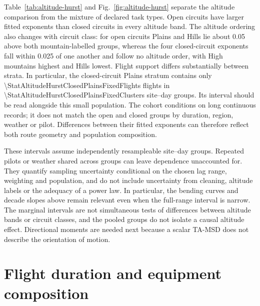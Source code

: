 \begin{table}[htbp]
 \centering
 \caption{Paraglider effective exponents $H_{\mathrm{eff}}$ from the full
 10--10,000-s fit, separately for declared open and closed circuits.
 Brackets give marginal 95\% site--day bootstrap intervals. Flight counts give the
 fixed cohort, which contributes the same flights at every lag. Weighting matches
 Fig.~\ref{fig:altitude-hurst}.}
 \label{tab:altitude-hurst}
 \small
 
\end{table}

Table~\ref{tab:altitude-hurst} and Fig.~\ref{fig:altitude-hurst} separate the
altitude comparison from the mixture of declared task types. Open circuits have
larger fitted exponents than closed circuits in every altitude band. The altitude
ordering also changes with circuit class: for open circuits Plains and Hills lie
about 0.05 above both mountain-labelled groups, whereas the four closed-circuit
exponents fall within 0.025 of one another and follow no altitude order, with High
mountains highest and Hills lowest. Flight support differs substantially between
strata. In particular, the closed-circuit Plains stratum contains only
\num{\StatAltitudeHurstClosedPlainsFixedFlights} flights in
\num{\StatAltitudeHurstClosedPlainsFixedClusters} site--day groups. Its interval
should be read alongside this small population. The cohort conditions on long
continuous records; it does not match the open and closed groups by duration,
region, weather or pilot. Differences between their fitted exponents can therefore
reflect both route geometry and population composition.

These intervals assume independently resampleable site--day groups. Repeated
pilots or weather shared across groups can leave dependence unaccounted for.
They quantify sampling uncertainty conditional on the chosen lag range,
weighting and population, and do not include uncertainty from cleaning,
altitude labels or the adequacy of a power law. In particular, the bending
curves and decade slopes above remain relevant even when the full-range
interval is narrow. The marginal intervals are not simultaneous tests of
differences between altitude bands or circuit classes, and the pooled groups do not isolate a
causal altitude effect. Directional moments are needed next because a scalar
TA-MSD does not describe the orientation of motion.

\FloatBarrier
\FloatBarrier
\endgroup
\FloatBarrier
\section{Flight duration and equipment composition}
\label{sec:duration-check}

